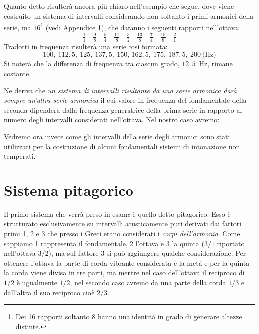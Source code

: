 Quanto detto risulterà ancora più chiaro nell'esempio che segue, dove viene
costruito un sistema di intervalli considerando non soltanto i primi armonici
della serie, ma $16$\footnote{Dei 16 rapporti soltanto 8 hanno una identità in
grado di generare altezze distinte.} (vedi Appendice 1), che daranno i seguenti
rapporti nell'ottava:
\[
  \tfrac{1}{1} \quad \tfrac{9}{8} \quad \tfrac{5}{4} \quad \tfrac{11}{8} \quad
  \tfrac{3}{2} \quad \tfrac{13}{8} \quad \tfrac{7}{4} \quad \tfrac{15}{8} \quad
  \tfrac{2}{1}
\]
Tradotti in frequenza risulterà una serie così formata:
\[
  100,\ 112{,}5,\ 125,\ 137{,}5,\ 150,\ 162{,}5,\ 175,\ 187{,}5,\ 200~\text{(Hz)}
\]
Si noterà che la differenza di frequenza tra ciascun grado, $12{,}5$~Hz, rimane
costante.

Ne deriva che \emph{un sistema di intervalli risultante da una serie armonica darà
sempre un'altra serie armonica} il cui valore in frequenza del fondamentale
della seconda dipenderà dalla frequenza generatrice della prima serie in
rapporto al numero degli intervalli considerati nell'ottava. Nel nostro caso
avremo:
\begin{center}
\end{center}
Vedremo ora invece come gli intervalli della serie degli armonici sono stati
utilizzati per la costruzione di alcuni fondamentali sistemi di intonazione non
temperati.

\section{Sistema pitagorico}

Il primo sistema che verrà preso in esame è quello detto pitagorico. Esso è
strutturato esclusivamente su intervalli acusticamente puri derivati dai fattori
primi 1, 2 e 3 che presso i Greci erano considerati i \emph{corpi dell'armonia}.
Come sappiamo 1 rappresenta il fondamentale, 2 l'ottava e 3 la quinta ($3/1$
riportato nell'ottava $3/2$), ma sul fattore 3 si può aggiungere qualche
considerazione. Per ottenere l'ottava la parte di corda vibrante considerata è
la metà e per la quinta la corda viene divisa in tre parti, ma mentre nel caso
dell'ottava il reciproco di $1/2$ è ugualmente $1/2$, nel secondo caso avremo da
una parte della corda $1/3$ e dall'altra il suo reciproco cioè $2/3$.

